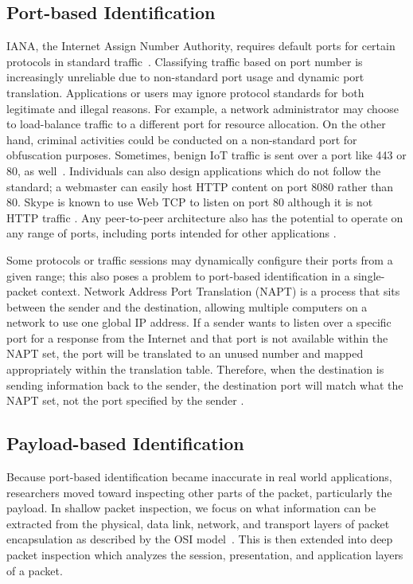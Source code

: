 \subsection{Port-based Identification}
IANA, the Internet Assign Number Authority, requires default ports for certain protocols in standard traffic~\cite{IANA}. Classifying traffic based on port number is increasingly unreliable due to non-standard port usage and dynamic port translation. Applications or users may ignore protocol standards for both legitimate and illegal reasons. For example, a network administrator may choose to load-balance traffic to a different port for resource allocation. On the other hand, criminal activities could be conducted on a non-standard port for obfuscation purposes. Sometimes, benign IoT traffic is sent over a port like 443 or 80, as well~\cite{charyyev2020iot}. Individuals can also design applications which do not follow the standard; a webmaster can easily host HTTP content on port 8080 rather than 80. Skype is known to use Web TCP to listen on port 80 although it is not HTTP traffic \cite{Freire}. Any peer-to-peer architecture also has the potential to operate on any range of ports, including ports intended for other applications \cite{Karagiannis}.

Some protocols or traffic sessions may dynamically configure their ports from a given range; this also poses a problem to port-based identification in a single-packet context. Network Address Port Translation (NAPT) is a process that sits between the sender and the destination, allowing multiple computers on a network to use one global IP address. If a sender wants to listen over a specific port for a response from the Internet and that port is not available within the NAPT set, the port will be translated to an unused number and mapped appropriately within the translation table. Therefore, when the destination is sending information back to the sender, the destination port will match what the NAPT set, not the port specified by the sender \cite{Smith}.

\subsection{Payload-based Identification}
Because port-based identification became inaccurate in real world applications, researchers moved toward inspecting other parts of the packet, particularly the payload. In shallow packet inspection, we focus on what information can be extracted from the physical, data link, network, and transport layers of packet encapsulation as described by the OSI model~\cite{OSI}. This is then extended into deep packet inspection which analyzes the session, presentation, and application layers of a packet.

